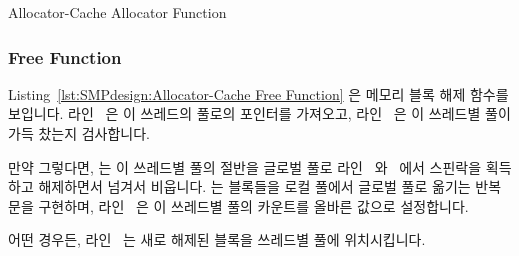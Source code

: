 \begin{listing}[tbp]

\caption{Allocator-Cache Allocator Function}
\label{lst:SMPdesign:Allocator-Cache Allocator Function}
\end{listing}

\subsubsection{Free Function}

\begin{fcvref}
Listing~\ref{lst:SMPdesign:Allocator-Cache Free Function} 은 메모리 블록 해제
함수를 보입니다.
라인~ 은 이 쓰레드의 풀로의 포인터를 가져오고, 라인~
은 이 쓰레드별 풀이 가득 찼는지 검사합니다.

만약 그렇다면,  는 이 쓰레드별 풀의 절반을 글로벌
풀로 라인~ 와~ 에서 스핀락을 획득하고 해제하면서 넘겨서
비웁니다.
 는 블록들을 로컬 풀에서 글로벌 풀로 옮기는
반복문을 구현하며, 라인~ 은 이 쓰레드별 풀의 카운트를 올바른 값으로
설정합니다.

어떤 경우든, 라인~ 는 새로 해제된 블록을 쓰레드별 풀에
위치시킵니다.
\end{fcvref}

